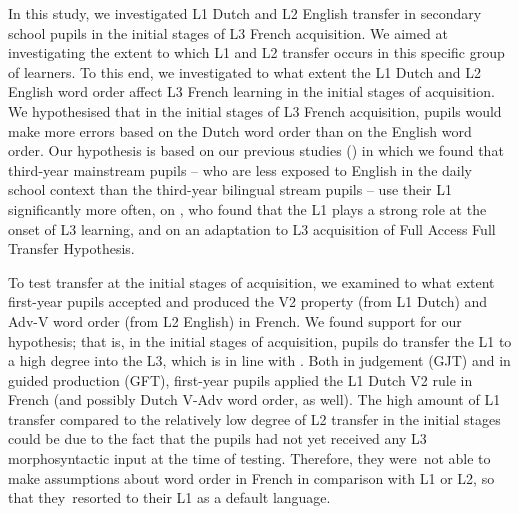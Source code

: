 \documentclass[output=paper,modfonts,nonflat, newtxmath]{langsci/langscibook}
\begin{document}
In this study, we investigated L1 Dutch and L2 English transfer in secondary school pupils in the initial stages of L3 French acquisition. We aimed at investigating the extent to which L1 and L2 transfer occurs in this specific group of learners. To this end, we investigated to what extent the L1 Dutch and L2 English word order affect L3 French learning in the initial stages of acquisition. We hypothesised that in the initial stages of L3 French acquisition, pupils would make more errors based on the Dutch word order than on the English word order. Our hypothesis is based on  our previous studies (\citealt{StadtEtAl2016, StadtEtAl2018Exposure}) in which we found that third-year mainstream pupils – who are less exposed to English in the daily school context than the third-year bilingual stream pupils – use their L1 significantly more often, on  \citet{Hermas2010, Hermas2014Morphosyntax, Hermas2014Relatives}, who found that the L1 plays a strong role at the onset of L3 learning, and  on an adaptation to L3 acquisition of  Full Access Full Transfer Hypothesis.

  To test transfer at the initial stages of acquisition, we examined to what extent first-year pupils accepted and produced the V2 property (from L1 Dutch) and Adv-V word order (from L2 English) in French. We found support for our hypothesis; that is, in the initial stages of acquisition, pupils do transfer the L1 to a high degree into the L3, which is in line with \citet{Hermas2010, Hermas2014Morphosyntax, Hermas2014Relatives}. Both in judgement (GJT) and in guided production (GFT), first-year pupils applied the L1 Dutch V2 rule in French (and possibly Dutch V-Adv word order, as well). The high amount of L1 transfer compared to the relatively low degree of L2 transfer in the initial stages could be due to the fact that the pupils had not yet received any L3 morphosyntactic input at the time of testing. Therefore, they were~not able to make assumptions about word order in French in comparison with L1 or L2, so that they~resorted to their L1 as a default language.
\end{document}

